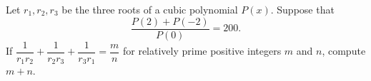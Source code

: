 Let $r_1, r_2, r_3$ be the three roots of a cubic polynomial $P(x)$. Suppose that $$\dfrac{P(2) + P(-2)}{P(0)}= 200.$$If $\dfrac{1}{r_1r_2}+ \dfrac{1}{r_2r_3}+\dfrac{1}{r_3r_1}= \dfrac{m}{n}$ for relatively prime positive integers $m$ and $n$, compute $m + n$.

